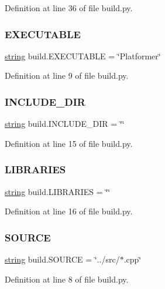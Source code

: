 Definition at line 36 of file build.\+py.

\mbox{\label{namespacebuild_ad848a55f54f2234a8c862b0c3597ac1b}} 
\subsubsection{\texorpdfstring{EXECUTABLE}{EXECUTABLE}}
{\footnotesize\ttfamily \mbox{\hyperlink{_s_d_l__opengl__glext_8h_ae84541b4f3d8e1ea24ec0f466a8c568b}{string}} build.\+E\+X\+E\+C\+U\+T\+A\+B\+LE = \char`\"{}Platformer\char`\"{}}



Definition at line 9 of file build.\+py.

\mbox{\label{namespacebuild_a5d6144bd70c120b901b0047a008b89ad}} 
\subsubsection{\texorpdfstring{INCLUDE\_DIR}{INCLUDE\_DIR}}
{\footnotesize\ttfamily \mbox{\hyperlink{_s_d_l__opengl__glext_8h_ae84541b4f3d8e1ea24ec0f466a8c568b}{string}} build.\+I\+N\+C\+L\+U\+D\+E\+\_\+\+D\+IR = \char`\"{}\char`\"{}}



Definition at line 15 of file build.\+py.

\mbox{\label{namespacebuild_a88bc45090f5d9a0b72dc833bfe64e032}} 
\subsubsection{\texorpdfstring{LIBRARIES}{LIBRARIES}}
{\footnotesize\ttfamily \mbox{\hyperlink{_s_d_l__opengl__glext_8h_ae84541b4f3d8e1ea24ec0f466a8c568b}{string}} build.\+L\+I\+B\+R\+A\+R\+I\+ES = \char`\"{}\char`\"{}}



Definition at line 16 of file build.\+py.

\mbox{\label{namespacebuild_a832e50b60ae1bc20032caf0540c2176b}} 
\subsubsection{\texorpdfstring{SOURCE}{SOURCE}}
{\footnotesize\ttfamily \mbox{\hyperlink{_s_d_l__opengl__glext_8h_ae84541b4f3d8e1ea24ec0f466a8c568b}{string}} build.\+S\+O\+U\+R\+CE = \char`\"{}../src/$\ast$.cpp\char`\"{}}



Definition at line 8 of file build.\+py.

